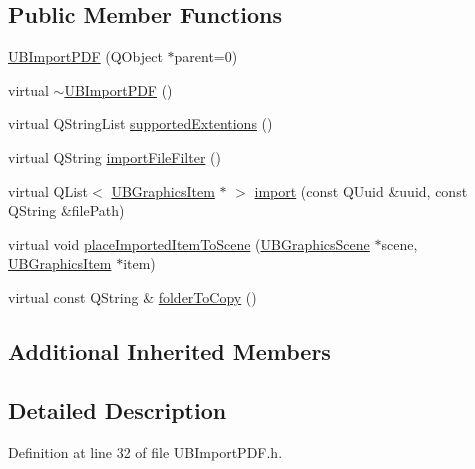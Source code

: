 \subsection*{Public Member Functions}
\begin{DoxyCompactItemize}
\item 
\hyperlink{class_u_b_import_p_d_f_adec2dbf90f24b2b411abd35f16915b7e}{U\-B\-Import\-P\-D\-F} (Q\-Object $\ast$parent=0)
\item 
virtual \hyperlink{class_u_b_import_p_d_f_a8031bd011fa8e896cb637169b691ae95}{$\sim$\-U\-B\-Import\-P\-D\-F} ()
\item 
virtual Q\-String\-List \hyperlink{class_u_b_import_p_d_f_a421ff05cb24735d42dd1a5efdaefe029}{supported\-Extentions} ()
\item 
virtual Q\-String \hyperlink{class_u_b_import_p_d_f_ad20104cc798726ef14d542d2730b782b}{import\-File\-Filter} ()
\item 
virtual Q\-List$<$ \hyperlink{class_u_b_graphics_item}{U\-B\-Graphics\-Item} $\ast$ $>$ \hyperlink{class_u_b_import_p_d_f_ad6080898ff16b76d5f5df7841b8b9c61}{import} (const Q\-Uuid \&uuid, const Q\-String \&file\-Path)
\item 
virtual void \hyperlink{class_u_b_import_p_d_f_aa0634a56798312ce8f6e7df1792f90b1}{place\-Imported\-Item\-To\-Scene} (\hyperlink{class_u_b_graphics_scene}{U\-B\-Graphics\-Scene} $\ast$scene, \hyperlink{class_u_b_graphics_item}{U\-B\-Graphics\-Item} $\ast$item)
\item 
virtual const Q\-String \& \hyperlink{class_u_b_import_p_d_f_a41a4202e19a7af2555e36ff59aeda143}{folder\-To\-Copy} ()
\end{DoxyCompactItemize}
\subsection*{Additional Inherited Members}


\subsection{Detailed Description}


Definition at line 32 of file U\-B\-Import\-P\-D\-F.\-h.



